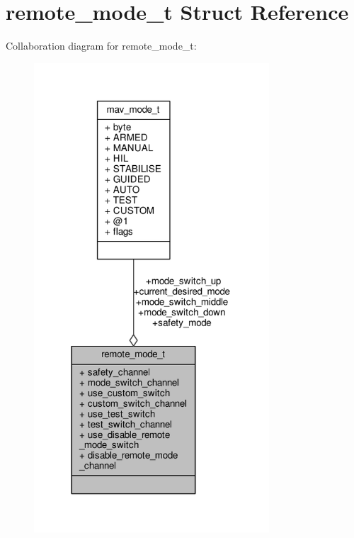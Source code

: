 \hypertarget{structremote__mode__t}{\section{remote\+\_\+mode\+\_\+t Struct Reference}
\label{structremote__mode__t}
}


Collaboration diagram for remote\+\_\+mode\+\_\+t\+:
\nopagebreak
\begin{figure}[H]
\begin{center}
\leavevmode
\includegraphics[width=249pt]{structremote__mode__t__coll__graph}
\end{center}
\end{figure}
